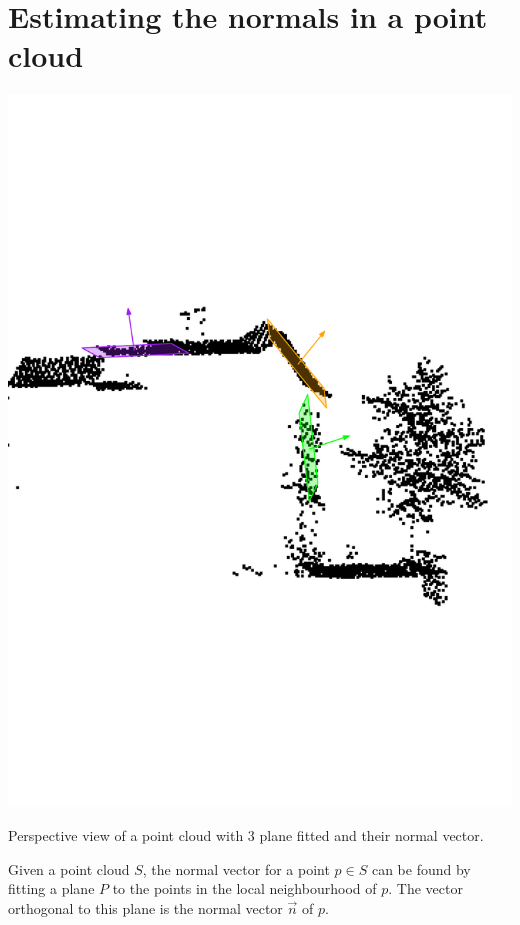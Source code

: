 
\graphicspath{{appendices/normalplane/figs/}}

\chapter{Estimating the normals in a point cloud}%
\label{app:normalplane}

\begin{marginfigure}
  \centering
  \includegraphics[width=\linewidth]{normal_demo.pdf}
  \caption{Perspective view of a point cloud with 3 plane fitted and their normal vector.}%
\label{fig:normal_demo}
\end{marginfigure}

Given a point cloud $S$, the normal vector for a point $p \in S$ can be found by fitting a plane $P$ to the points in the local neighbourhood of $p$. 
The vector orthogonal to this plane is the normal vector $\vec{n}$ of $p$.

